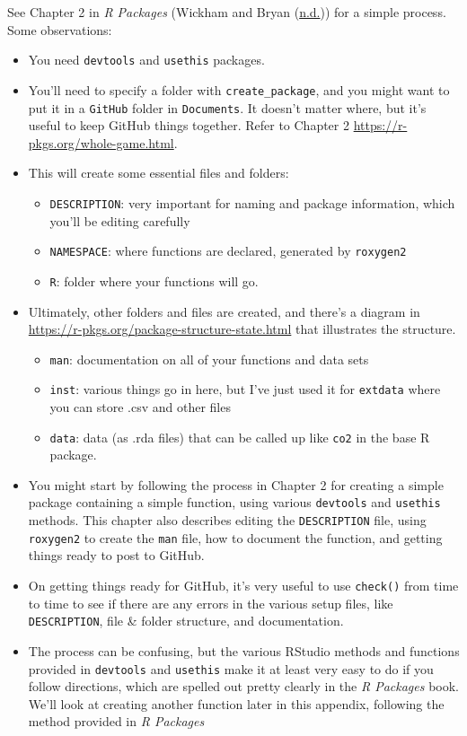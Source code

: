 \documentclass[
]{book}
\providecommand{\tightlist}{%
  \setlength{\itemsep}{0pt}\setlength{\parskip}{0pt}}
\begin{document}
See Chapter 2 in \emph{R Packages} (Wickham and Bryan (\protect\hyperlink{ref-r-pkgs}{n.d.})) for a simple process. Some observations:

\begin{itemize}
\item
  You need \texttt{devtools} and \texttt{usethis} packages.
\item
  You'll need to specify a folder with \texttt{create\_package}, and you might want to put it in a \texttt{GitHub} folder in \texttt{Documents}. It doesn't matter where, but it's useful to keep GitHub things together. Refer to Chapter 2 \url{https://r-pkgs.org/whole-game.html}.
\item
  This will create some essential files and folders:

  \begin{itemize}
  \tightlist
  \item
    \texttt{DESCRIPTION}: very important for naming and package information, which you'll be editing carefully
  \item
    \texttt{NAMESPACE}: where functions are declared, generated by \texttt{roxygen2}
  \item
    \texttt{R}: folder where your functions will go.
  \end{itemize}
\item
  Ultimately, other folders and files are created, and there's a diagram in \url{https://r-pkgs.org/package-structure-state.html} that illustrates the structure.

  \begin{itemize}
  \tightlist
  \item
    \texttt{man}: documentation on all of your functions and data sets
  \item
    \texttt{inst}: various things go in here, but I've just used it for \texttt{extdata} where you can store .csv and other files
  \item
    \texttt{data}: data (as .rda files) that can be called up like \texttt{co2} in the base R package.
  \end{itemize}
\item
  You might start by following the process in Chapter 2 for creating a simple package containing a simple function, using various \texttt{devtools} and \texttt{usethis} methods. This chapter also describes editing the \texttt{DESCRIPTION} file, using \texttt{roxygen2} to create the \texttt{man} file, how to document the function, and getting things ready to post to GitHub.
\item
  On getting things ready for GitHub, it's very useful to use \texttt{check()} from time to time to see if there are any errors in the various setup files, like \texttt{DESCRIPTION}, file \& folder structure, and documentation.
\item
  The process can be confusing, but the various RStudio methods and functions provided in \texttt{devtools} and \texttt{usethis} make it at least very easy to do if you follow directions, which are spelled out pretty clearly in the \emph{R Packages} book. We'll look at creating another function later in this appendix, following the method provided in \emph{R Packages}
\end{itemize}
\end{document}
